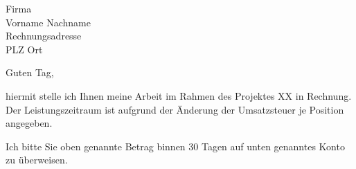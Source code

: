 \documentclass[parskip=half-,ngerman]{scrartcl}
\begin{document}


\begin{letter}{Firma\\Vorname Nachname\\Rechnungsadresse\\PLZ Ort}
	
\opening{Guten Tag,}

hiermit stelle ich Ihnen meine Arbeit im Rahmen des Projektes XX in Rechnung. Der Leistungszeitraum ist aufgrund der Änderung der Umsatzsteuer je Position angegeben.


\PrintInvoiceTabular

Ich bitte Sie oben genannte Betrag binnen 30 Tagen auf unten genanntes Konto zu überweisen.


	
\end{letter}
\end{document}
